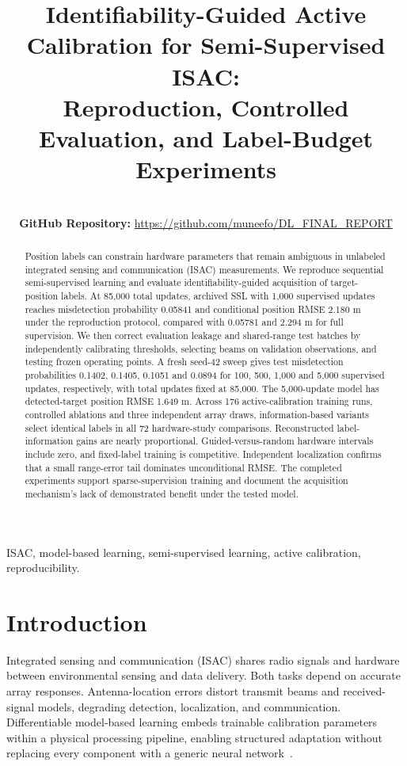 \documentclass[conference]{IEEEtran}
\title{Identifiability-Guided Active Calibration for Semi-Supervised ISAC:\\Reproduction, Controlled Evaluation, and Label-Budget Experiments}
\author{\IEEEauthorblockN{Muneef Mohammed, Andrew Liang, and Mohammad Al-Shammeri}
\IEEEauthorblockA{CISC 867: Deep Learning, Queen's University\\Final report draft, November 16, 2026}\\
\textbf{GitHub Repository:} \url{https://github.com/muneefo/DL_FINAL_REPORT}}
\begin{document}
\maketitle
\begin{abstract}Position labels can constrain hardware parameters that remain ambiguous in unlabeled integrated sensing and communication (ISAC) measurements. We reproduce sequential semi-supervised learning and evaluate identifiability-guided acquisition of target-position labels. At 85,000 total updates, archived SSL with 1,000 supervised updates reaches misdetection probability 0.05841 and conditional position RMSE 2.180 m under the reproduction protocol, compared with 0.05781 and 2.294 m for full supervision. We then correct evaluation leakage and shared-range test batches by independently calibrating thresholds, selecting beams on validation observations, and testing frozen operating points. A fresh seed-42 sweep gives test misdetection probabilities 0.1402, 0.1405, 0.1051 and 0.0894 for 100, 500, 1,000 and 5,000 supervised updates, respectively, with total updates fixed at 85,000. The 5,000-update model has detected-target position RMSE 1.649 m. Across 176 active-calibration training runs, controlled ablations and three independent array draws, information-based variants select identical labels in all 72 hardware-study comparisons. Reconstructed label-information gains are nearly proportional. Guided-versus-random hardware intervals include zero, and fixed-label training is competitive. Independent localization confirms that a small range-error tail dominates unconditional RMSE. The completed experiments support sparse-supervision training and document the acquisition mechanism's lack of demonstrated benefit under the tested model.\end{abstract}
\begin{IEEEkeywords}ISAC, model-based learning, semi-supervised learning, active calibration, reproducibility.\end{IEEEkeywords}
\section{Introduction}
Integrated sensing and communication (ISAC) shares radio signals and hardware between environmental sensing and data delivery. Both tasks depend on accurate array responses. Antenna-location errors distort transmit beams and received-signal models, degrading detection, localization, and communication. Differentiable model-based learning embeds trainable calibration parameters within a physical processing pipeline, enabling structured adaptation without replacing every component with a generic neural network~\cite{icc,multi}.
\end{document}
